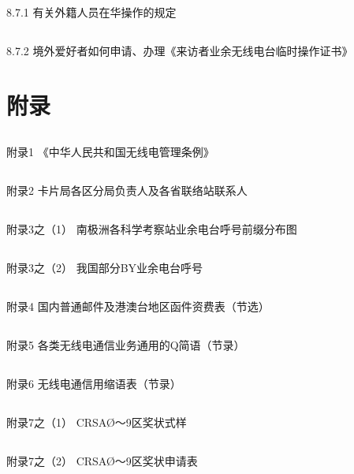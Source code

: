 \documentclass[12pt,UTF8]{ctexbook}
\begin{document}
\section{}8.7.1 有关外籍人员在华操作的规定
\section{}8.7.2 境外爱好者如何申请、办理《来访者业余无线电台临时操作证书》

\backmatter

\chapter{附录}

\section{}附录1 《中华人民共和国无线电管理条例》
\section{}附录2 卡片局各区分局负责人及各省联络站联系人
\section{}附录3之（1） 南极洲各科学考察站业余电台呼号前缀分布图
\section{}附录3之（2） 我国部分BY业余电台呼号
\section{}附录4 国内普通邮件及港澳台地区函件资费表（节选）
\section{}附录5 各类无线电通信业务通用的Q简语（节录）
\section{}附录6 无线电通信用缩语表（节录）
\section{}附录7之（1） CRSAØ～9区奖状式样
\section{}附录7之（2） CRSAØ～9区奖状申请表
\end{document}

